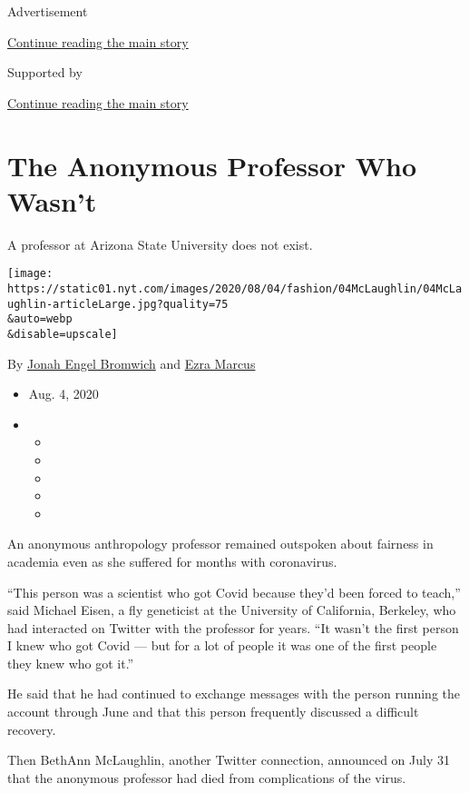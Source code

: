 Advertisement

\protect\hyperlink{after-top}{Continue reading the main story}

Supported by

\protect\hyperlink{after-sponsor}{Continue reading the main story}

\hypertarget{the-anonymous-professor-who-wasnt}{%
\section{The Anonymous Professor Who
Wasn't}\label{the-anonymous-professor-who-wasnt}}

A professor at Arizona State University does not exist.

\texttt{[image: https://static01.nyt.com/images/2020/08/04/fashion/04McLaughlin/04McLaughlin-articleLarge.jpg?quality=75\\\&auto=webp\\\&disable=upscale]}

By \href{https://www.nytimes.com/by/jonah-engel-bromwich}{Jonah Engel
Bromwich} and \href{https://www.nytimes.com/by/ezra-marcus}{Ezra Marcus}

\begin{itemize}
\item
  Aug. 4, 2020
\item
  \begin{itemize}
  \item
  \item
  \item
  \item
  \item
  \end{itemize}
\end{itemize}

An anonymous anthropology professor remained outspoken about fairness in
academia even as she suffered for months with coronavirus.

``This person was a scientist who got Covid because they'd been forced
to teach,'' said Michael Eisen, a fly geneticist at the University of
California, Berkeley, who had interacted on Twitter with the professor
for years. ``It wasn't the first person I knew who got Covid --- but for
a lot of people it was one of the first people they knew who got it.''

He said that he had continued to exchange messages with the person
running the account through June and that this person frequently
discussed a difficult recovery.

Then BethAnn McLaughlin, another Twitter connection, announced on July
31 that the anonymous professor had died from complications of the
virus.

